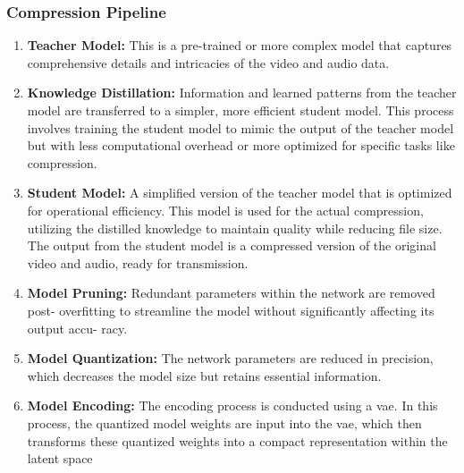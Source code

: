 \documentclass{ioereport}
\begin{document}
        \subsubsection{Compression Pipeline}
        \begin{enumerate}[label=\textbf{\roman*.}]
          \item \textbf{Teacher Model:} This is a pre-trained or more complex model that captures comprehensive details and intricacies of the video and audio data.
          \item \textbf{Knowledge Distillation:} Information and learned patterns from the teacher model are transferred to a simpler, more efficient student model. This process involves training the student model to mimic the output of the teacher model but with less computational overhead or more optimized for specific tasks like compression.
          \item \textbf{Student Model:} A simplified version of the teacher model that is optimized for operational efficiency. This model is used for the actual compression, utilizing the distilled knowledge to maintain quality while reducing file size. The output from the student model is a compressed version of the original video and audio, ready for transmission.
          
        \item \textbf{Model Pruning:} Redundant parameters within the network are removed post- overfitting to streamline the model without significantly affecting its output accu- racy.
        \item \textbf{Model Quantization:} The network parameters are reduced in precision, which decreases the model size but retains essential information.
        \item \textbf{Model Encoding:} The encoding process is conducted using a \gls{vae}. In this process, the quantized model weights are input into the \gls{vae}, which then transforms these quantized weights into a compact representation within the latent space
    
        \end{enumerate}
\end{document}
